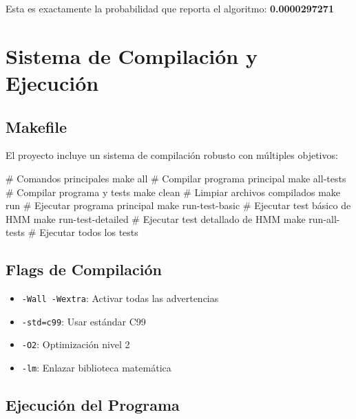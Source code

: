 \documentclass[
]{article}
\newenvironment{Shaded}{\begin{snugshade}}{\end{snugshade}}
\newcommand{\CommentTok}[1]{\textcolor[rgb]{0.37,0.37,0.37}{#1}}
\newcommand{\NormalTok}[1]{\textcolor[rgb]{0.00,0.23,0.31}{#1}}
\providecommand{\tightlist}{%
  \setlength{\itemsep}{0pt}\setlength{\parskip}{0pt}}
\begin{document}
Esta es exactamente la probabilidad que reporta el algoritmo:
\textbf{0.0000297271}

\section{Sistema de Compilación y
Ejecución}\label{sistema-de-compilaciuxf3n-y-ejecuciuxf3n}

\subsection{Makefile}\label{makefile}

El proyecto incluye un sistema de compilación robusto con múltiples
objetivos:

\begin{Shaded}
\begin{Highlighting}[]
\CommentTok{\# Comandos principales}
\NormalTok{make all                  }\CommentTok{\# Compilar programa principal}
\NormalTok{make all{-}tests           }\CommentTok{\# Compilar programa y tests}
\NormalTok{make clean               }\CommentTok{\# Limpiar archivos compilados}
\NormalTok{make run                 }\CommentTok{\# Ejecutar programa principal}
\NormalTok{make run{-}test{-}basic      }\CommentTok{\# Ejecutar test básico de HMM}
\NormalTok{make run{-}test{-}detailed   }\CommentTok{\# Ejecutar test detallado de HMM}
\NormalTok{make run{-}all{-}tests       }\CommentTok{\# Ejecutar todos los tests}
\end{Highlighting}
\end{Shaded}

\subsection{Flags de Compilación}\label{flags-de-compilaciuxf3n}

\begin{itemize}
\tightlist
\item
  \texttt{-Wall\ -Wextra}: Activar todas las advertencias
\item
  \texttt{-std=c99}: Usar estándar C99
\item
  \texttt{-O2}: Optimización nivel 2
\item
  \texttt{-lm}: Enlazar biblioteca matemática
\end{itemize}

\subsection{Ejecución del Programa}\label{ejecuciuxf3n-del-programa}
\end{document}
